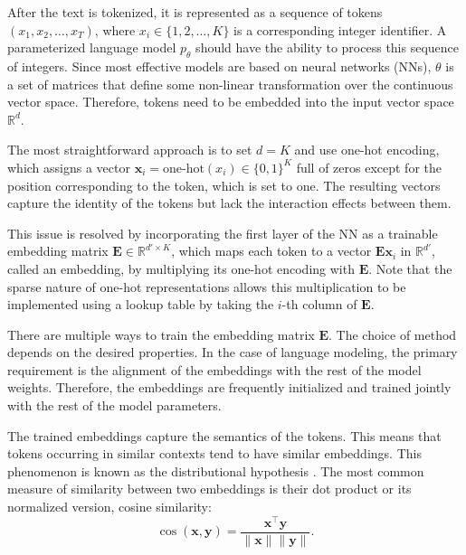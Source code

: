 \begin{sloppypar}
After the text is tokenized, it is represented as a sequence of tokens \((x_1, x_2, \ldots, x_T)\), where \(x_i \in \{1, 2, \ldots, K\}\) is a corresponding integer identifier. A parameterized language model \(p_\theta\) should have the ability to process this sequence of integers. Since most effective models are based on neural networks (NNs), \(\theta\) is a set of matrices that define some non-linear transformation over the continuous vector space. Therefore, tokens need to be embedded into the input vector space \(\mathbb{R}^d\).
\end{sloppypar}

The most straightforward approach is to set \(d=K\) and use one-hot encoding, which assigns a vector \(\mathbf{x}_i = \textrm{one-hot}(x_i) \in \{0, 1\}^K\) full of zeros except for the position corresponding to the token, which is set to one. The resulting vectors capture the identity of the tokens but lack the interaction effects between them.

This issue is resolved by incorporating the first layer of the NN as a trainable embedding matrix \(\mathbf{E} \in \mathbb{R}^{d' \times K}\), which maps each token to a vector \(\mathbf{Ex}_i\) in \(\mathbb{R}^{d'}\), called an embedding, by multiplying its one-hot encoding with \(\mathbf{E}\). Note that the sparse nature of one-hot representations allows this multiplication to be implemented using a lookup table by taking the \(i\)-th column of \(\mathbf{E}\).

There are multiple ways to train the embedding matrix \(\mathbf{E}\). The choice of method depends on the desired properties. In the case of language modeling, the primary requirement is the alignment of the embeddings with the rest of the model weights. Therefore, the embeddings are frequently initialized and trained jointly with the rest of the model parameters.

The trained embeddings capture the semantics of the tokens. This means that tokens occurring in similar contexts tend to have similar embeddings. This phenomenon is known as the distributional hypothesis \parencite{harris1954}. The most common measure of similarity between two embeddings is their dot product or its normalized version, cosine similarity: %
\begin{equation}
    \cos(\mathbf{x}, \mathbf{y}) = \frac{\mathbf{x}^\top \mathbf{y}}{\|\mathbf{x}\| \|\mathbf{y}\|}.
\end{equation}  

